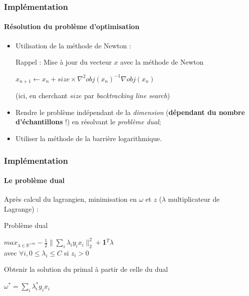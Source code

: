 \documentclass{beamer}
\begin{document}
\begin{frame}
\frametitle{Implémentation}
\framesubtitle{Résolution du problème d'optimisation}

\begin{itemize}
\item Utilisation de la méthode de Newton :

\begin{block}{Rappel : Mise à jour du vecteur $x$ avec la méthode de Newton}
          \begin{center}
          $x_{n+1} \leftarrow x_{n} + size \times \nabla^2 obj(x_n)^{-1}\nabla obj(x_n)$
          \end{center}

  (ici, en cherchant $size$ par \emph{backtracking line search})
\end{block}

\item Rendre le problème indépendant de la \emph{dimension} (\textbf{dépendant du nombre d'échantillons} !) en résolvant le \emph{problème dual};

\item Utiliser la méthode de la barrière logarithmique.

\end{itemize}

\end{frame}

\begin{frame}
\frametitle{Implémentation}
\framesubtitle{Le problème dual}

Après calcul du lagrangien, minimisation en $\omega$ et $z$ ($\lambda$ multiplicateur de Lagrange) :

\begin{block}{Problème dual}
             \begin{center}
             $max_{\lambda \in \mathbb{R}^{+m}} -\frac{1}{2}\|\sum_i\lambda_iy_ix_i\|^2_2 + $\textbf{1}$^T\lambda$\\ 
             avec $\forall i, 0 \leq \lambda_i \leq C$ si $z_i > 0$\\
             \end{center}
\end{block}

\begin{block}{Obtenir la solution du primal à partir de celle du dual}
             \begin{center}
               $\omega^{*} = \sum_i \lambda^{*}_i y_i x_i$
             \end{center}
\end{block}

\end{frame}
\end{document}
